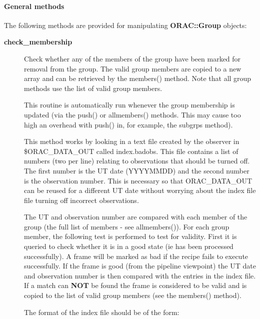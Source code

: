 \paragraph*{General methods\label{ORAC::Group_General_methods}}


The following methods are provided for manipulating \textbf{ORAC::Group}
objects:

\begin{description}

\item[{\textbf{check\_membership}}] \mbox{}

Check whether any of the members of the group have been marked for
removal from the group. The valid group members are copied
to a new array and can be retrieved by the members() method.
Note that all group methods use the list of valid group
members.



This routine is automatically run whenever the group membership
is updated (via the push() or  allmembers() methods. This may
cause too high an overhead with push() in, for example, the
subgrps method).



This method works by looking in a text file created by the
observer in \$ORAC\_DATA\_OUT called index.badobs. This file
contains a list of numbers (two per line) relating to observations
that should be turned off. The first number is the UT date
(YYYYMMDD) and the second number is the observation
number. This is necessary so that ORAC\_DATA\_OUT can be reused
for a different UT date without worrying about the index file
file turning off incorrect observations.



The UT and observation number are compared with each member of
the group (the full list of members - see allmembers()).
For each group member, the following test is performed to test
for validity. First it is queried to check whether it is in a
good state (ie has been processed successfully).
A frame will be marked as bad if the recipe fails to execute
successfully. If the frame is good (from the pipeline viewpoint)
the UT date and observation number is then compared with the
entries in the index file. If a match can \textbf{NOT} be found the
frame is considered to be valid and is copied to the list of valid
group members (see the members() method).



The format of the index file should be of the form:


\end{description}
